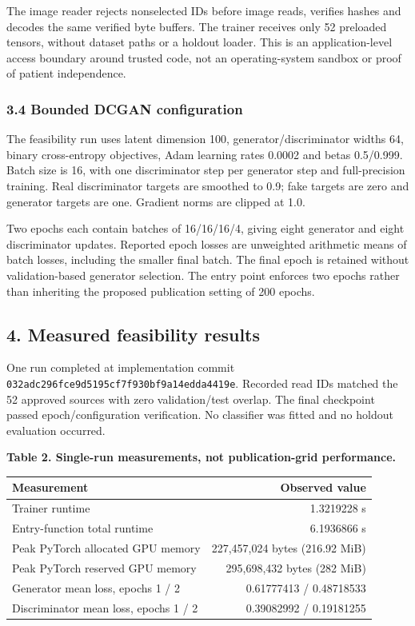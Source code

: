 \documentclass[
]{article}
\begin{document}
The image reader rejects nonselected IDs before image reads, verifies
hashes and decodes the same verified byte buffers. The trainer receives
only 52 preloaded tensors, without dataset paths or a holdout loader.
This is an application-level access boundary around trusted code, not an
operating-system sandbox or proof of patient independence.

\subsubsection{3.4 Bounded DCGAN
configuration}\label{bounded-dcgan-configuration}

The feasibility run uses latent dimension 100, generator/discriminator
widths 64, binary cross-entropy objectives, Adam learning rates 0.0002
and betas 0.5/0.999. Batch size is 16, with one discriminator step per
generator step and full-precision training. Real discriminator targets
are smoothed to 0.9; fake targets are zero and generator targets are
one. Gradient norms are clipped at 1.0.

Two epochs each contain batches of 16/16/16/4, giving eight generator
and eight discriminator updates. Reported epoch losses are unweighted
arithmetic means of batch losses, including the smaller final batch. The
final epoch is retained without validation-based generator selection.
The entry point enforces two epochs rather than inheriting the proposed
publication setting of 200 epochs.

\subsection{4. Measured feasibility
results}\label{measured-feasibility-results}

One run completed at implementation commit
\texttt{032adc296fce9d5195cf7f930bf9a14edda4419e}. Recorded read IDs
matched the 52 approved sources with zero validation/test overlap. The
final checkpoint passed epoch/configuration verification. No classifier
was fitted and no holdout evaluation occurred.

\textbf{Table 2. Single-run measurements, not publication-grid
performance.}

\begin{longtable}[]{@{}lr@{}}
\toprule\noalign{}
Measurement & Observed value \\
\midrule\noalign{}
\endhead
\bottomrule\noalign{}
\endlastfoot
Trainer runtime & 1.3219228 s \\
Entry-function total runtime & 6.1936866 s \\
Peak PyTorch allocated GPU memory & 227,457,024 bytes (216.92 MiB) \\
Peak PyTorch reserved GPU memory & 295,698,432 bytes (282 MiB) \\
Generator mean loss, epochs 1 / 2 & 0.61777413 / 0.48718533 \\
Discriminator mean loss, epochs 1 / 2 & 0.39082992 / 0.19181255 \\
\end{longtable}
\end{document}
